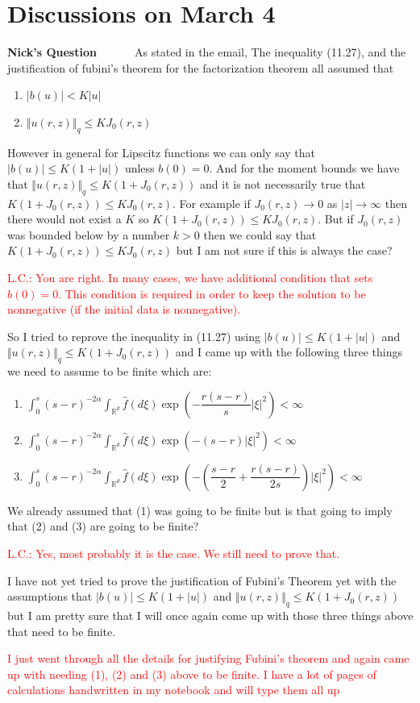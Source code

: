 \documentclass[a4paper,11pt]{article}
\theoremstyle{plain}
\theoremstyle{definition}
\newcommand{\R}{\mathbb{R}}
\newcounter{NQ}
\newenvironment{NickQuestion}[1][] %
  {\refstepcounter{NQ}
  \begin{mdframed}[backgroundcolor=lightgray]\textbf{Nick's Question \theNQ \: #1~~}~~~\noindent}%
  {\end{mdframed}}
\numberwithin{NQ}{section}
\numberwithin{LQ}{section}
\numberwithin{ZQ}{section}
\begin{document}
\section{Discussions on March 4}
\begin{NickQuestion}
As stated in the email, The inequality (11.27), and the justification of fubini's theorem for the factorization theorem all assumed that 
\begin{enumerate}
    \item $|b(u)|<K|u|$
    \item $\Vert u(r,z) \Vert_q \le K J_0(r,z)$
\end{enumerate}
However in general for Lipscitz functions we can only say that $|b(u)|\le K(1+|u|)$ unless $b(0)=0$. And for the moment bounds we have that $\Vert u(r,z) \Vert_q \le K(1+J_0(r,z))$ and it is not necessarily true that $K(1+J_0(r,z)) \le K J_0(r,z)$. For example if $J_0(r,z)\to 0$ as $|z|\to \infty$ then there would not exist a $K$ so $K(1+J_0(r,z)) \le K J_0(r,z)$. But if $J_0(r,z)$ was bounded below by a number $k>0$ then we could say that $K(1+J_0(r,z)) \le K J_0(r,z)$ but I am not sure if this is always the case? 

\textcolor{red}{L.C.: You are right. In many cases, we have additional condition that sets $b(0)=0$. This condition is required in order to keep the solution to be nonnegative (if the initial data is nonnegative). }

So I tried to reprove the inequality in (11.27) using $|b(u)|\le K(1+|u|)$ and $\Vert u(r,z) \Vert_q \le K(1+J_0(r,z))$ and I came up with the following three things we need to assume to be finite which are: 
\begin{enumerate}
    \item $\int_0^s(s-r)^{-2\alpha}\int_{\R^d}\hat f (d\xi)\exp\left(-\dfrac{r(s-r)}{s}|\xi|^2\right) < \infty$
    \item $\int_0^s(s-r)^{-2\alpha}\int_{\R^d}\hat f (d\xi)\exp\left(-(s-r)|\xi|^2\right) < \infty$
    \item $\int_0^s(s-r)^{-2\alpha}\int_{\R^d}\hat f (d\xi)\exp\left(-\left(\dfrac{s-r}{2}+\dfrac{r(s-r)}{2s}\right)|\xi|^2\right) < \infty$
\end{enumerate}
We already assumed that (1) was going to be finite but is that going to imply that (2) and (3) are going to be finite? 

\textcolor{red}{L.C.: Yes, most probably it is the case. We still need to prove that.}

I have not yet tried to prove the justification of Fubini's Theorem yet with the assumptions that $|b(u)|\le K(1+|u|)$ and $\Vert u(r,z) \Vert_q \le K(1+J_0(r,z))$ but I am pretty sure that I will once again come up with those three things above that need to be finite.

\textcolor{red}{I just went through all the details for justifying Fubini's theorem and again came up with needing (1), (2) and (3) above to be finite. I have a lot of pages of calculations handwritten in my notebook and will type them all up}
\end{NickQuestion}
\end{document}
